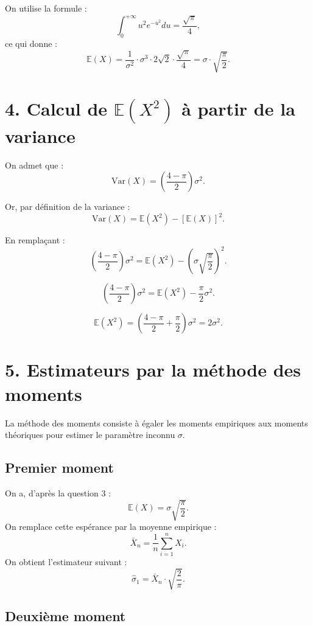 \documentclass[a4paper,11pt]{article}
\begin{document}
On utilise la formule :
\[
\int_0^{+\infty} u^2 e^{-u^2} du = \frac{\sqrt{\pi}}{4},
\]
ce qui donne :
\[
\mathbb{E}(X) = \frac{1}{\sigma^2} \cdot \sigma^3 \cdot 2\sqrt{2} \cdot \frac{\sqrt{\pi}}{4} = \sigma \cdot \sqrt{\frac{\pi}{2}}.
\]


\vspace{1em}
\section*{4. Calcul de $\mathbb{E}(X^2)$ à partir de la variance}

On admet que :
\[
\text{Var}(X) = \left(\frac{4 - \pi}{2}\right) \sigma^2.
\]

Or, par définition de la variance :
\[
\text{Var}(X) = \mathbb{E}(X^2) - \left[\mathbb{E}(X)\right]^2.
\]

En remplaçant :
\[
\left(\frac{4 - \pi}{2}\right)\sigma^2 = \mathbb{E}(X^2) - \left(\sigma \sqrt{\frac{\pi}{2}}\right)^2.
\]

\[
\left(\frac{4 - \pi}{2}\right)\sigma^2 = \mathbb{E}(X^2) - \frac{\pi}{2} \sigma^2.
\]

\[
\mathbb{E}(X^2) = \left( \frac{4 - \pi}{2} + \frac{\pi}{2} \right) \sigma^2 = 2\sigma^2.
\]


\vspace{1em}

\vspace{1em}
\section*{5. Estimateurs par la méthode des moments}

La méthode des moments consiste à égaler les moments empiriques aux moments théoriques pour estimer le paramètre inconnu $\sigma$.

\subsection*{Premier moment}

On a, d'après la question 3 :
\[
\mathbb{E}(X) = \sigma \sqrt{\frac{\pi}{2}}.
\]
On remplace cette espérance par la moyenne empirique :
\[
\bar{X}_n = \frac{1}{n} \sum_{i=1}^n X_i.
\]
On obtient l’estimateur suivant :
\[
\hat{\sigma}_1 = \bar{X}_n \cdot \sqrt{\frac{2}{\pi}}.
\]

\subsection*{Deuxième moment}
\end{document}
